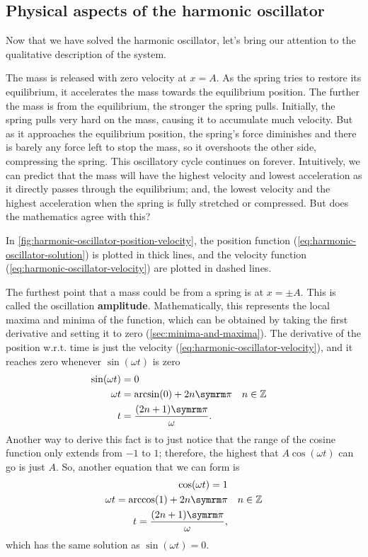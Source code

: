 \subsection{Physical aspects of the harmonic oscillator}

Now that we have solved the harmonic oscillator, let's bring our attention to the qualitative description of the system.

The mass is released with zero velocity at \(x = A\). As the spring tries to restore its equilibrium, it accelerates the mass towards the equilibrium position. The further the mass is from the equilibrium, the stronger the spring pulls. Initially, the spring pulls very hard on the mass, causing it to accumulate much velocity. But as it approaches the equilibrium position, the spring's force diminishes and there is barely any force left to stop the mass, so it overshoots the other side, compressing the spring. This oscillatory cycle continues on forever. Intuitively, we can predict that the mass will have the highest velocity and lowest acceleration as it directly passes through the equilibrium; and, the lowest velocity and the highest acceleration when the spring is fully stretched or compressed. But does the mathematics agree with this?

In \cref{fig:harmonic-oscillator-position-velocity}, the position function (\cref{eq:harmonic-oscillator-solution}) is plotted in thick lines, and the velocity function (\cref{eq:harmonic-oscillator-velocity}) are plotted in dashed lines.

The furthest point that a mass could be from a spring is at \(x = \pm A\). This is called the oscillation \textbf{amplitude}. Mathematically, this represents the local maxima and minima of the function, which can be obtained by taking the first derivative and setting it to zero (\cref{sec:minima-and-maxima}). The derivative of the position w.r.t. time is just the velocity (\cref{eq:harmonic-oscillator-velocity}), and it reaches zero whenever \(\sin(\omega t)\) is zero 
\begin{align}
  \sin(\omega t) & = 0                                                                                              \\
  \omega t       & = \arcsin(0) + 2n\cpi                                                      &  & n \in \mathbb{Z} \\
  t              & = \frac{(2n + 1)\cpi}{\omega}. \label{eq:harmonic-oscillator-max-position}
\end{align}
Another way to derive this fact is to just notice that the range of the cosine function only extends from \(-1\) to \(1\); therefore, the highest that \(A\cos(\omega t)\) can go is just \(A\). So, another equation that we can form is
\begin{align}
  \cos(\omega t) = 1                                   \\
  \omega t = \arccos(1) + 2n\cpi &  & n \in \mathbb{Z} \\
  t = \frac{(2n + 1)\cpi}{\omega},
\end{align}
which has the same solution as \(\sin(\omega t) = 0\).

